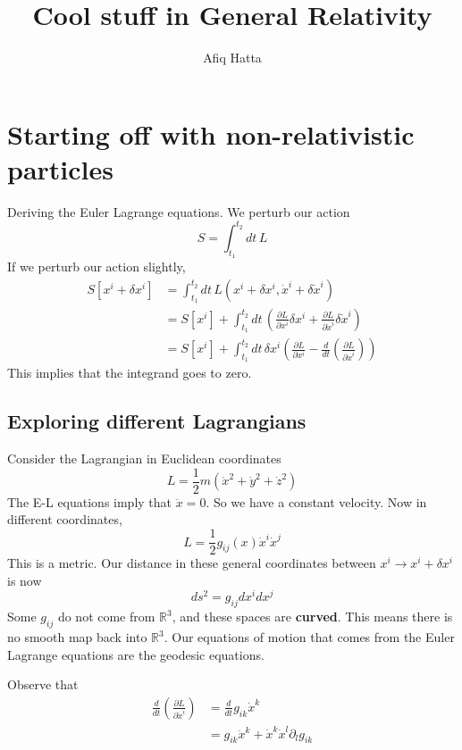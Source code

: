 \documentclass[11pt, a4paper]{article}   	%
\author{Afiq Hatta}
\title{Cool stuff in General Relativity}
\theoremstyle{slplain}
\begin{document}
\maketitle

\tableofcontents

\section{Starting off with non-relativistic particles} 
Deriving the Euler Lagrange equations. We perturb our action \[ S = \int_{t_1}^{t_2} dt \, L \] 
If we perturb our action slightly, 
\begin{align*} 
 S[x^i + \delta x^i ]& = \int_{t_1}^{t_2} dt \, L( x^i + \delta x^i, \dot{x}^i + \delta  \dot{x}^i ) \\ 
& = S[x^i ] + \int_{t_1}^{t_2} dt \, \left( \frac{ \partial L}{\partial x^i } \delta x^i + \frac{ \partial L }{ \partial \dot{x}^i } \delta \dot{x} ^i \right) \\
& = S[x^i] + \int_{ t_1 }^{t_2} dt \, \delta x^i \left( \frac{ \partial L }{ \partial x^i }  - \frac{d}{dt} \left( \frac{ \partial L }{ \partial \dot{x}^i } \right) \right ) 
\end{align*} 
This implies that the integrand goes to zero. 

\subsection{Exploring different Lagrangians} 
Consider the Lagrangian in Euclidean coordinates 
\[ L = \frac{1}{2} m ( \dot{x}^2 + \dot{y}^2 + \dot{z}^2 ) 
\] 
The E-L equations imply that $\ddot {x} = 0 $. So we have a constant velocity. Now in different coordinates, 
\[ L = \frac{ 1}{2} g_{ ij } (x) \dot{x}^i \dot{x}^j \] 
This is a metric. Our distance in these general coordinates between $x^i \rightarrow x^i + \delta x^i $ is now 
\[ 
ds^2 = g_{ij} dx^i dx^j \] 
Some $g_{ij} $ do not come from $\mathbb{R}^3 $, and these spaces are \textbf{curved}. This means there is no smooth map back into $\mathbb{R}^3$. Our equations of motion that comes from the Euler Lagrange equations are the geodesic equations.  

Observe that 
\begin{align*} 
\frac{d}{dt} \left( \frac{ \partial L}{\partial \dot{x}^i } \right) &= \frac{d}{dt} g_{ ik}\dot{x}^k \\
&= g_{ik} \ddot{x}^k + \dot{x}^k \dot{x}^l \partial_l g_{ ik}\end{align*} 
\end{document}
